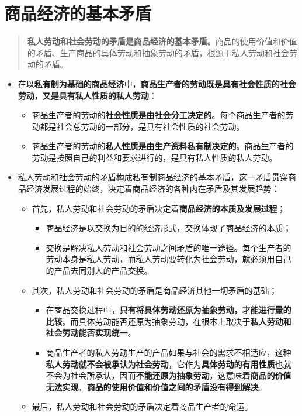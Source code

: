 \documentclass[
]{article}
\begin{document}
\hypertarget{ux5546ux54c1ux7ecfux6d4eux7684ux57faux672cux77dbux76fe}{%
\section{商品经济的基本矛盾}\label{ux5546ux54c1ux7ecfux6d4eux7684ux57faux672cux77dbux76fe}}

\begin{quote}
\textbf{私人劳动和社会劳动的矛盾是商品经济的基本矛盾。}商品的使用价值和价值的矛盾、生产商品的具体劳动和抽象劳动的矛盾，根源于私人劳动和社会劳动的矛盾。
\end{quote}

\begin{itemize}
\item
  在以\textbf{私有制为基础的商品经济}中，\textbf{商品生产者的劳动既是具有社会性质的社会劳动，又是具有私人性质的私人劳动}：

  \begin{itemize}
  \item
    商品生产者的劳动的\textbf{社会性质是由社会分工决定的}。每个商品生产者的劳动都是社会总劳动的一部分，是具有社会性质的社会劳动。
  \item
    商品生产者的劳动的\textbf{私人性质是由生产资料私有制决定的}。商品生产者的劳动是按照自己的利益和要求进行的，是具有私人性质的私人劳动。
  \end{itemize}
\item
  私人劳动和社会劳动的矛盾构成私有制商品经济的基本矛盾，这一矛盾贯穿商品经济发展过程的始终，决定着商品经济的各种内在矛盾及其发展趋势：

  \begin{itemize}
  \item
    首先，私人劳动和社会劳动的矛盾决定着\textbf{商品经济的本质及发展过程}；

    \begin{itemize}
    \item
      商品经济是以交换为目的的经济形式，交换体现了商品经济的本质；
    \item
      交换是解决私人劳动和社会劳动之间矛盾的唯一途径。每个生产者的劳动本身是私人劳动，而私人劳动要转化为社会劳动，就必须用自己的产品去同别人的产品交换。
    \end{itemize}
  \item
    其次，私人劳动和社会劳动的矛盾是商品经济其他一切矛盾的基础；

    \begin{itemize}
    \item
      在商品交换过程中，\textbf{只有将具体劳动还原为抽象劳动，才能进行量的比较}。而具体劳动能否还原为抽象劳动，在根本上取决于\textbf{私人劳动和社会劳动能否实现统一}。
    \item
      商品生产者的私人劳动生产的产品如果与社会的需求不相适应，这种\textbf{私人劳动就不会被承认为社会劳动}，它作为\textbf{具体劳动的有用性质}也就不会为社会所承认，因而\textbf{不能还原为抽象劳动}，这意味着\textbf{商品的价值无法实现}，\textbf{商品的使用价值和价值之间的矛盾没有得到解决}。
    \end{itemize}
  \item
    最后，私人劳动和社会劳动的矛盾决定着商品生产者的命运。


\end{itemize}
\end{itemize}
\end{document}
